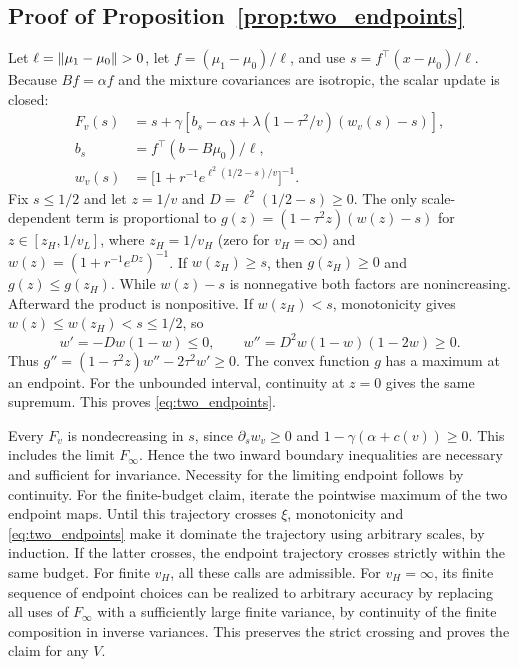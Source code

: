 \subsection{Proof of Proposition~\ref{prop:two_endpoints}}
Let $\ell=\lVert\mu_1-\mu_0\rVert>0$, let $f=(\mu_1-\mu_0)/\ell$, and use
$s=f^\top(x-\mu_0)/\ell$. Because $Bf=\alpha f$ and the mixture
covariances are isotropic, the scalar update is closed:
\begin{align*}
 F_v(s)&=s+\gamma[b_s-\alpha s+\lambda(1-\tau^2/v)(w_v(s)-s)],\\
 b_s&=f^\top(b-B\mu_0)/\ell,\\
 w_v(s)&=\big[1+r^{-1}e^{\ell^2(1/2-s)/v}\big]^{-1}.
\end{align*}
Fix $s\le1/2$ and let $z=1/v$ and $D=\ell^2(1/2-s)\ge0$.
The only scale-dependent term is proportional to
$g(z)=(1-\tau^2 z)(w(z)-s)$ for
$z\in[z_H,1/v_L]$, where $z_H=1/v_H$ (zero for $v_H=\infty$)
and $w(z)=(1+r^{-1}e^{Dz})^{-1}$.
If $w(z_H)\ge s$, then $g(z_H)\ge0$ and $g(z)\le g(z_H)$.
While $w(z)-s$ is nonnegative both factors are nonincreasing.
Afterward the product is nonpositive.
If $w(z_H)<s$, monotonicity gives $w(z)\le w(z_H)<s\le1/2$, so
\[
 w'=-Dw(1-w)\le0,\qquad
 w''=D^2w(1-w)(1-2w)\ge0.
\]
Thus $g''=(1-\tau^2z)w''-2\tau^2 w'\ge0$. The convex function $g$
has a maximum at an endpoint. For the unbounded interval,
continuity at $z=0$ gives the same supremum. This proves
\eqref{eq:two_endpoints}.

Every $F_v$ is nondecreasing in $s$, since $\partial_s w_v\ge0$
and $1-\gamma(\alpha+c(v))\ge0$. This includes the limit $F_\infty$.
Hence the two inward boundary inequalities are necessary and sufficient
for invariance. Necessity for the limiting endpoint follows by continuity.
For the finite-budget claim, iterate the pointwise maximum of the two endpoint
maps. Until this trajectory crosses $\xi$, monotonicity and
\eqref{eq:two_endpoints} make it dominate the trajectory using arbitrary
scales, by induction. If the latter crosses, the endpoint trajectory crosses
strictly within the same budget. For finite $v_H$, all these calls are
admissible. For $v_H=\infty$, its finite sequence of endpoint choices
can be realized to arbitrary accuracy by replacing all uses of $F_\infty$
with a sufficiently large finite variance, by continuity of the finite
composition in inverse variances. This preserves the strict crossing
and proves the claim for any $V$.
